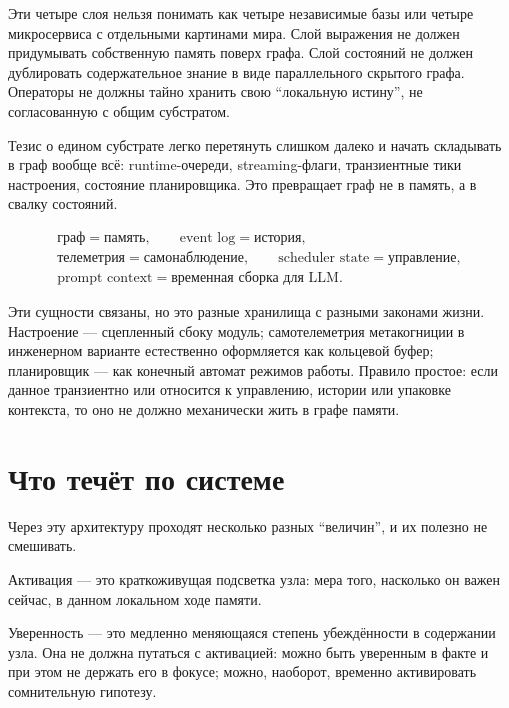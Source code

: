 \begin{pitfall}
Эти четыре слоя нельзя понимать как четыре независимые базы или четыре
микросервиса с отдельными картинами мира. Слой выражения не должен
придумывать собственную память поверх графа. Слой состояний не должен
дублировать содержательное знание в виде параллельного скрытого графа.
Операторы не должны тайно хранить свою ``локальную истину'', не
согласованную с общим субстратом.
\end{pitfall}

\begin{pitfall}
Тезис о едином субстрате легко перетянуть слишком далеко и начать складывать
в граф вообще всё: runtime-очереди, streaming-флаги, транзиентные тики
настроения, состояние планировщика. Это превращает граф не в память, а в
свалку состояний.

\[
\begin{gathered}
\text{граф} = \text{память}, \qquad
\text{event log} = \text{история},\\
\text{телеметрия} = \text{самонаблюдение}, \qquad
\text{scheduler state} = \text{управление},\\
\text{prompt context} = \text{временная сборка для LLM}.
\end{gathered}
\]

Эти сущности связаны, но это разные хранилища с разными законами жизни.
Настроение --- сцепленный сбоку модуль; самотелеметрия метакогниции в
инженерном варианте естественно оформляется как кольцевой буфер; планировщик
--- как конечный автомат режимов работы. Правило простое: если данное
транзиентно или относится к управлению, истории или упаковке контекста, то
оно не должно механически жить в графе памяти.
\end{pitfall}

\section{Что течёт по системе}

Через эту архитектуру проходят несколько разных ``величин'', и их полезно не
смешивать.

\begin{definition}[Активация]
Активация --- это краткоживущая подсветка узла: мера того, насколько он важен
сейчас, в данном локальном ходе памяти.
\end{definition}

\begin{definition}[Уверенность]
Уверенность --- это медленно меняющаяся степень убеждённости в содержании
узла. Она не должна путаться с активацией: можно быть уверенным в факте и при
этом не держать его в фокусе; можно, наоборот, временно активировать
сомнительную гипотезу.
\end{definition}

